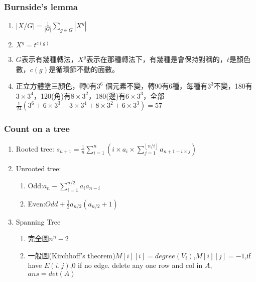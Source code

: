\subsubsection{Burnside's lemma}
\begin{enumerate}\itemsep = -3pt
	\item $|X/G| = \frac{1}{|G|}\sum_{g \in G}|X^g|$
	\item $X^g=t^{c(g)}$
	\item $G$表示有幾種轉法，$X^g$表示在那種轉法下，有幾種是會保持對稱的，$t$是顏色數，$c(g)$是循環節不動的面數。
	\item 正立方體塗三顏色，轉0有$3^6$ 個元素不變，轉90有6種，每種有$3^3$不變，180有$3\times 3^4$，120(角)有$8\times 3^2$，180(邊)有$6\times 3^3$，全部$\frac{1}{24}\left(3^6+6\times 3^3 + 3 \times 3^4 + 8 \times 3^2 + 6 \times 3^3 \right) = 57$
\end{enumerate}

\subsubsection{Count on a tree}
\begin{enumerate}\itemsep = -3pt
	\item Rooted tree: $s_{n+1}=\frac{1}{n}\sum_{i=1}^{n}(i\times a_i\times \sum_{j=1}^{\left \lfloor  n/i\right \rfloor} a_{n+1-i\times j})$
	\item Unrooted tree: 
	\begin{enumerate}\itemsep = -2pt
		\item Odd:$a_n-\sum_{i=1}^{n/2}a_ia_{n-i}$
		\item Even:$Odd+\frac{1}{2}a_{n/2}(a_{n/2}+1)$
	\end{enumerate}
	\item Spanning Tree
	\begin{enumerate}\itemsep = -2pt
		\item 完全圖$n^n-2$
		\item 一般圖(Kirchhoff's theorem)$M[i][i]=degree(V_i)$,$M[i][j]=-1$,if have $E(i,j)$,$0$ if no edge. delete any one row and col in $A$, $ans = det(A)$
	\end{enumerate}
\end{enumerate}

%